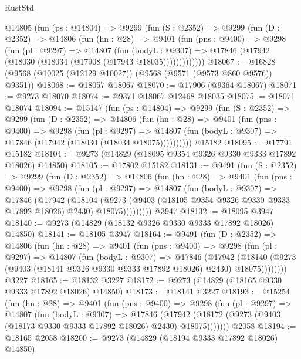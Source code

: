 \begin{lexlean}{RustStd}
\begin{coremodule}
{\begin{coremodule}
{{{{{{{{{{{{{{{{{{{{{{{{{{{{{{{{{{{{{{{{{{{{{{{{{{{{{{{    @14805
      (fun (ps : @14804) =>
      @9299
        (fun (S : @2352) =>
        @9299
          (fun (D : @2352) =>
          @14806
            (fun (hn : @28) =>
            @9401
              (fun (pns : @9400) =>
              @9298
                (fun (pl : @9297) =>
                @14807
                  (fun (bodyL : @9307) =>
                  @17846 (@17942 (@18030 (@18034 (@17908 (@17943 @18035)))))))))))))
@18067 := @16828 (@9568 (@10025 (@12129 @10027)) (@9568 (@9571 (@9573 @860 @9576)) @9351))
@18068 := @18057 @18067
@18070 := @17906 (@9364 @18067)
@18071 := @9273 @18070
@18074 := @9371 @18067 @12468 @18035
@18075 := @18071 @18074
@18094 := @15147
    (fun (ps : @14804) =>
    @9299
      (fun (S : @2352) =>
      @9299
        (fun (D : @2352) =>
        @14806
          (fun (hn : @28) =>
          @9401
            (fun (pns : @9400) =>
            @9298
              (fun (pl : @9297) =>
              @14807 (fun (bodyL : @9307) => @17846 (@17942 (@18030 (@18034 @18075))))))))))
    @15182
@18095 := @17791 @15182
@18104 := @9273 (@14829 (@18095 @9354 @9326 @9330 @9333 @17892 @18026) @14850)
@18105 := @17802 @15182
@18131 := @9491
    (fun (S : @2352) =>
    @9299
      (fun (D : @2352) =>
      @14806
        (fun (hn : @28) =>
        @9401
          (fun (pns : @9400) =>
          @9298
            (fun (pl : @9297) =>
            @14807
              (fun (bodyL : @9307) =>
              @17846
                (@17942
                  (@18104
                    (@9273
                      (@9403 (@18105 @9354 @9326 @9330 @9333 @17892 @18026) @2430)
                      @18075)))))))))
    @3947
@18132 := @18095 @3947
@18140 := @9273 (@14829 (@18132 @9326 @9330 @9333 @17892 @18026) @14850)
@18141 := @18105 @3947
@18164 := @9491
    (fun (D : @2352) =>
    @14806
      (fun (hn : @28) =>
      @9401
        (fun (pns : @9400) =>
        @9298
          (fun (pl : @9297) =>
          @14807
            (fun (bodyL : @9307) =>
            @17846
              (@17942
                (@18140 (@9273 (@9403 (@18141 @9326 @9330 @9333 @17892 @18026) @2430) @18075))))))))
    @3227
@18165 := @18132 @3227
@18172 := @9273 (@14829 (@18165 @9330 @9333 @17892 @18026) @14850)
@18173 := @18141 @3227
@18193 := @15254
    (fun (hn : @28) =>
    @9401
      (fun (pns : @9400) =>
      @9298
        (fun (pl : @9297) =>
        @14807
          (fun (bodyL : @9307) =>
          @17846
            (@17942 (@18172 (@9273 (@9403 (@18173 @9330 @9333 @17892 @18026) @2430) @18075)))))))
    @2058
@18194 := @18165 @2058
@18200 := @9273 (@14829 (@18194 @9333 @17892 @18026) @14850)
}}}}}}}}}}}}}}}}}}}}}}}}}}}}}}}}}}}}}}}}}}}}}}}}}}}}}}}
\end{coremodule}}
\end{coremodule}
\end{lexlean}
